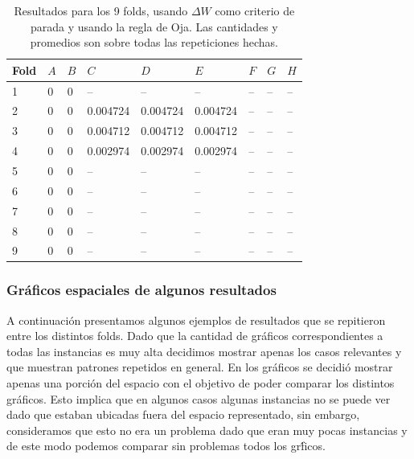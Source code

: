 \documentclass[informe.tex]{subfiles}
\begin{document}
	\begin{table}[H]
	  \centering
	  \begin{tabular}{|l|l|l|l|l|l|l|l|l|} \hline
	  Fold & $A$ & $B$ & $C$ & $D$ & $E$ & $F$ & $G$ & $H$ \\ \hline
	  1& 0 & 0 & -- & -- & -- & -- & -- & -- \\ \hline
	  2& 0 & 0 & 0.004724 & 0.004724 & 0.004724 & -- & -- & -- \\ \hline
	  3& 0 & 0 & 0.004712 & 0.004712 & 0.004712 & -- & -- & -- \\ \hline
	  4& 0 & 0 & 0.002974 & 0.002974 & 0.002974 & -- & -- & -- \\ \hline
	  5& 0 & 0 & -- & -- & -- & -- & -- & -- \\ \hline
	  6& 0 & 0 & -- & -- & -- & -- & -- & -- \\ \hline
	  7& 0 & 0 & -- & -- & -- & -- & -- & -- \\ \hline
	  8& 0 & 0 & -- & -- & -- & -- & -- & -- \\ \hline
	  9& 0 & 0 & -- & -- & -- & -- & -- & -- \\ \hline
	  \end{tabular}
	  \caption{Resultados para los 9 folds, usando $\Delta W$ como criterio de parada y usando la regla de Oja. Las cantidades y promedios son sobre todas las repeticiones hechas.}
	  \label{tab:pesos_oja}
	\end{table}            

	
	
	
      \subsubsection{Gráficos espaciales de algunos resultados}
	A continuación presentamos algunos ejemplos de resultados que se repitieron entre los distintos folds. Dado que la cantidad de gr\'aficos correspondientes a todas las instancias es muy alta decidimos mostrar apenas los casos relevantes y que muestran patrones repetidos en general. En los gráficos se decidió mostrar apenas una porción del espacio con el objetivo de poder comparar los distintos gr\'aficos. Esto implica que en algunos casos algunas instancias no se puede ver dado que estaban ubicadas fuera del espacio representado, sin embargo, consideramos que esto no era un problema dado que eran muy pocas instancias y de este modo podemos comparar sin problemas todos los gr\'ficos.
	
	
	
\end{document}

